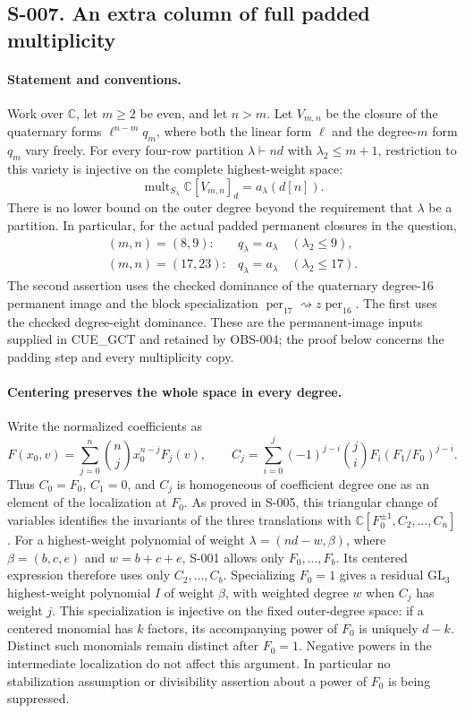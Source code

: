 \subsection{S-007. An extra column of full padded multiplicity}
\paragraph{Statement and conventions.}
Work over $\mathbb C$, let $m\geq2$ be even, and let $n>m$.
Let $V_{m,n}$ be the closure of the quaternary forms
$\ell^{n-m}q_m$, where both the linear form $\ell$ and the degree-$m$
form $q_m$ vary freely.  For every four-row partition
$\lambda\vdash nd$ with $\lambda_2\leq m+1$, restriction to this
variety is injective on the complete highest-weight space:
\[
 \operatorname{mult}_{S_\lambda}\mathbb C[V_{m,n}]_d
       =a_\lambda(d[n]).                                      \tag{S-007.1}
\]
There is no lower bound on the outer degree beyond the requirement
that $\lambda$ be a partition.  In particular, for the actual padded
permanent closures in the question,
\[
 \begin{array}{ll}
 (m,n)=(8,9):&q_\lambda=a_\lambda\quad(\lambda_2\leq9),\\
 (m,n)=(17,23):&q_\lambda=a_\lambda\quad(\lambda_2\leq17).
 \end{array}                                                  \tag{S-007.2}
\]
The second assertion uses the checked dominance of the quaternary
degree-16 permanent image and the block specialization
$\operatorname{per}_{17}\rightsquigarrow z\operatorname{per}_{16}$.
The first uses the checked degree-eight dominance.  These are the
permanent-image inputs supplied in CUE\_GCT and retained by OBS-004;
the proof below concerns the padding step and every multiplicity copy.

\paragraph{Centering preserves the whole space in every degree.}
Write the normalized coefficients as
\[
 F(x_0,v)=\sum_{j=0}^n\binom nj x_0^{n-j}F_j(v),\qquad
 C_j=\sum_{i=0}^j(-1)^{j-i}\binom ji
                  F_i(F_1/F_0)^{j-i}.
\]
Thus $C_0=F_0$, $C_1=0$, and $C_j$ is homogeneous of coefficient
degree one as an element of the localization at $F_0$.
As proved in S-005, this triangular change of variables identifies
the invariants of the three translations with
$\mathbb C[F_0^{\pm1},C_2,\ldots,C_n]$.
For a highest-weight polynomial of weight
$\lambda=(nd-w,\beta)$, where $\beta=(b,c,e)$ and $w=b+c+e$,
S-001 allows only $F_0,\ldots,F_b$.  Its centered expression therefore
uses only $C_2,\ldots,C_b$.
Specializing $F_0=1$ gives a residual $\mathrm{GL}_3$ highest-weight
polynomial $I$ of weight $\beta$, with weighted degree $w$ when
$C_j$ has weight $j$.
This specialization is injective on the fixed outer-degree space:
if a centered monomial has $k$ factors, its accompanying power of
$F_0$ is uniquely $d-k$.  Distinct such monomials remain distinct
after $F_0=1$.  Negative powers in the intermediate localization do
not affect this argument.  In particular no stabilization assumption
or divisibility assertion about a power of $F_0$ is being suppressed.

